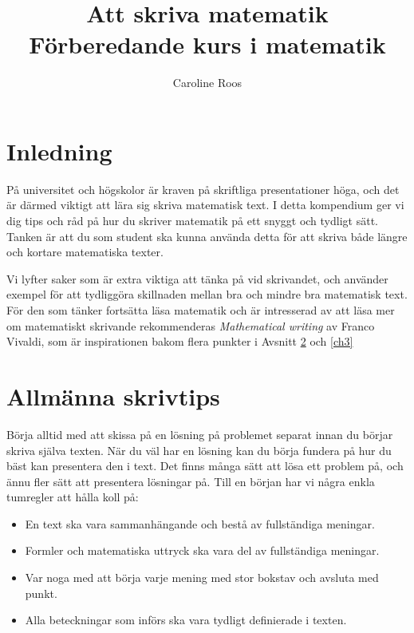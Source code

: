 \documentclass[titlepage]{article}
\title{Att skriva matematik \\$ $ \\\large Förberedande kurs i matematik}
\author{Caroline Roos}
\date{}
\begin{document}
\begin{titlepage}
    \maketitle
\end{titlepage}

\tableofcontents
\thispagestyle{empty}



\newpage
\setcounter{page}{1}

\section{Inledning}

På universitet och högskolor är kraven på skriftliga presentationer höga, och det är därmed viktigt att lära sig skriva matematisk text. I detta kompendium ger vi dig tips och råd på hur du skriver matematik på ett snyggt och tydligt sätt. Tanken är att du som student ska kunna använda detta för att skriva både längre och kortare matematiska texter.

Vi lyfter saker som är extra viktiga att tänka på vid skrivandet, och använder exempel för att tydliggöra skillnaden mellan bra och mindre bra matematisk text. För den som tänker fortsätta läsa matematik och är intresserad av att läsa mer om matematiskt skrivande rekommenderas \textit{Mathematical writing} av Franco Vivaldi\cite{vivaldi}, som är inspirationen bakom flera punkter i Avsnitt \ref{ch2} och \ref{ch3}



\section{Allmänna skrivtips}\label{ch2}

Börja alltid med att skissa på en lösning på problemet separat innan du börjar skriva själva texten. När du väl har en lösning kan du börja fundera på hur du bäst kan presentera den i text. Det finns många sätt att lösa ett problem på, och ännu fler sätt att presentera lösningar på. Till en början har vi några enkla tumregler att hålla koll på:

\begin{itemize}
    \item En text ska vara sammanhängande och bestå av fullständiga meningar.
    \item Formler och matematiska uttryck ska vara del av fullständiga meningar.
    \item Var noga med att börja varje mening med stor bokstav och avsluta med punkt.
    \item Alla beteckningar som införs ska vara tydligt definierade i texten.
\end{itemize}
\end{document}
